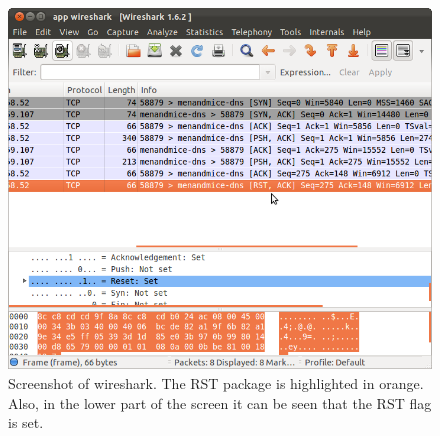 \begin{center}
\begin{figure}[h]
	\centering
	\mbox{\includegraphics[width=1\textwidth]{Images/tcp_rst.png}}
	\caption{Screenshot of wireshark. The RST package is highlighted in orange. Also, in the lower part of the screen it can be seen that the RST flag is set.}
	\label{fig:TCP_RST}
\end{figure}
\end{center}

\clearpage

